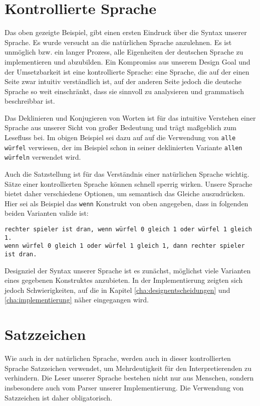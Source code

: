 \section{Kontrollierte Sprache}
\label{sec:kontrollierte_sprache}
	Das oben gezeigte Beispiel, gibt einen ersten Eindruck über die Syntax unserer Sprache. Es wurde versucht \dg an die natürlichen Sprache anzulehnen. Es ist unmöglich bzw. ein langer Prozess, alle Eigenheiten der deutschen Sprache zu implementieren und abzubilden. Ein Kompromiss aus unserem Design Goal und der Umsetzbarkeit ist eine kontrollierte Sprache: eine Sprache, die auf der einen Seite zwar intuitiv verständlich ist, auf der anderen Seite jedoch die deutsche Sprache so weit einschränkt, dass sie sinnvoll zu analysieren und grammatisch beschreibbar ist.

	Das Deklinieren und Konjugieren von Worten ist für das intuitive Verstehen einer Sprache aus unserer Sicht von großer Bedeutung und trägt maßgeblich zum Lesefluss bei. Im obigen Beispiel sei dazu auf auf die Verwendung von \texttt{alle würfel} verwiesen, der im Beispiel schon in seiner deklinierten Variante \texttt{allen würfeln} verwendet wird.

	Auch die Satzstellung ist für das Verständnis einer natürlichen Sprache wichtig. Sätze einer kontrollierten Sprache können schnell sperrig wirken. Unsere Sprache bietet daher verschiedene Optionen, um semantisch das Gleiche auszudrücken. Hier sei als Beispiel das \texttt{wenn} Konstrukt von oben angegeben, dass in folgenden beiden Varianten valide ist:
\begin{lstlisting}
rechter spieler ist dran, wenn würfel 0 gleich 1 oder würfel 1 gleich 1.
wenn würfel 0 gleich 1 oder würfel 1 gleich 1, dann rechter spieler ist dran.
\end{lstlisting}
	Designziel der Syntax unserer Sprache ist es zunächst, möglichst viele Varianten eines gegebenen Konstruktes anzubieten. In der Implementierung zeigten sich jedoch Schwierigkeiten, auf die in Kapitel \ref{cha:designentscheidungen} und \ref{cha:implementierung} näher eingegangen wird.

\section{Satzzeichen}
\label{sec:satzzeichen}
	Wie auch in der natürlichen Sprache, werden auch in dieser kontrollierten Sprache Satzzeichen verwendet, um Mehrdeutigkeit für den Interpretierenden zu verhindern. Die Leser unserer Sprache bestehen nicht nur aus Menschen, sondern insbesondere auch vom Parser unserer Implementierung. Die Verwendung von Satzzeichen ist daher obligatorisch.

